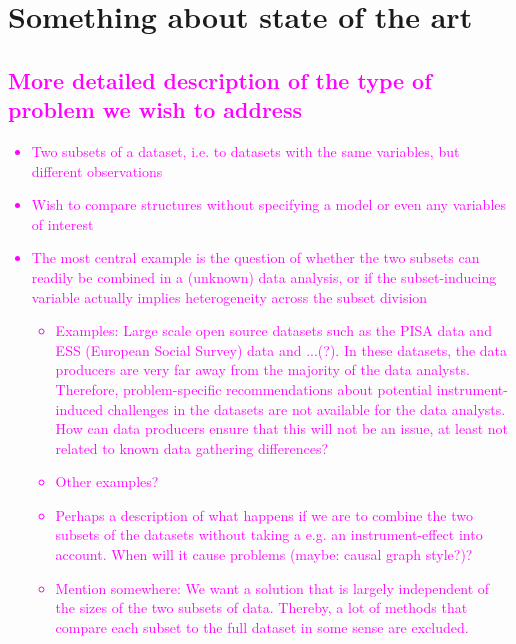 \documentclass[titlepage,11pt,twoside]{article}
\newcommand{\hl}[1]{\textcolor{magenta}{#1}}
\begin{document}
\section{Something about state of the art}
\label{sec:stateoftheart}
\subsection{\hl{More detailed description of the type of problem we wish to address}}
\hl{
\begin{itemize}
\item Two subsets of a dataset, i.e. to datasets with the same variables, but different observations
\item Wish to compare structures without specifying a model or even any variables of interest
\item The most central example is the question of whether the two subsets can readily be combined in a (unknown) data analysis, or if the subset-inducing variable actually implies heterogeneity across the subset division
	\begin{itemize}
		\item Examples: Large scale open source datasets such as the PISA data and ESS (European Social Survey) data and ...(?). In these datasets, the data producers are very far away from the majority of the data analysts. Therefore, problem-specific recommendations about potential instrument-induced challenges in the datasets are not available for the data analysts. How can data producers ensure that this will not be an issue, at least not related to known data gathering differences?
		\item Other examples?
		\item Perhaps a description of what happens if we are to combine the two subsets of the datasets without taking a e.g. an instrument-effect into account. When will it cause problems (maybe: causal graph style?)?
		\item Mention somewhere: We want a solution that is largely independent of the sizes of the two subsets of data. Thereby, a lot of methods that compare each subset to the full dataset in some sense are excluded.
	\end{itemize}
\end{itemize}
}
\end{document}
